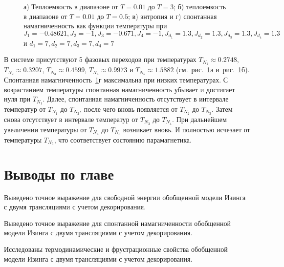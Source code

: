  \begin{figure}[h]
	\begin{minipage}{0.47\linewidth}
	\end{minipage}
	\hfill
	\begin{minipage}{0.47\linewidth}
	\end{minipage}
		\vfill
	\begin{minipage}{0.47\linewidth}
	\end{minipage}
	\hfill
	\begin{minipage}{0.47\linewidth}
	\end{minipage}
	\caption{а) Теплоемкость в диапазоне от $T=0.01$ до $T=3$; б) теплоемкость в диапазоне от $T=0.01$ до $T=0.5$; в) энтропия и г) спонтанная намагниченность как функции температуры при $J_1 = -0.48621, J_2 = -1, J_3 = -0.671, J_4 = -1, J_{d_1} = 1.3, J_{d_2} = 1.3, J_{d_3} = 1.3, J_{d_4} = 1.3$ и $d_1 = 7, d_2 = 7, d_3 = 7, d_4 = 7$}
	\label{5trans}
\end{figure}

В системе присутствуют 5 фазовых переходов при температурах $T_{N_1} \approx 0.2748$, $T_{N_2} \approx 0.3207$, $T_{N_3} \approx 0.4599$, $T_{N_4} \approx 0.9973$ и $T_{N_5} \approx 1.5882$ (см.~рис.~\ref{5trans}а и~рис.~\ref{5trans}б). Спонтанная намагниченность~\ref{5trans}г максимальна при низких температурах. С возрастанием температуры спонтанная намагниченность убывает и достигает нуля при $T_{N_1}$. Далее, спонтанная намагниченность отсутствует в интервале температур от $T_{N_1}$ до $T_{N_2}$, после чего вновь появляется от $T_{N_2}$ до $T_{N_3}$. Затем снова отсутствует в интервале температур от $T_{N_3}$ до $T_{N_4}$. При дальнейшем увеличении температуры от $T_{N_4}$ до $T_{N_5}$ возникает вновь. И полностью исчезает от температуры $T_{N_5}$, что соответствует состоянию парамагнетика. 

\section{Выводы по главе}

Выведено точное выражение для свободной энергии обобщенной модели Изинга с двумя трансляциями с учетом декорирования.

Выведено точное выражение для спонтанной намагниченности обобщенной модели Изинга с двумя трансляциями с учетом декорирования.

Исследованы термодинамические и фрустрационные свойства обобщенной модели Изинга с двумя трансляциями с учетом декорирования.

\FloatBarrier